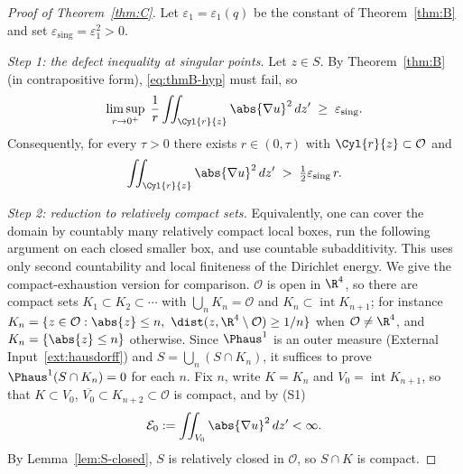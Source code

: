 \documentclass[11pt,reqno]{amsart}
\begin{document}
\begin{proof}[Proof of Theorem~\ref{thm:C}]
Let $\varepsilon_{1}=\varepsilon_{1}(q)$ be the constant of
Theorem~\ref{thm:B} and set $\varepsilon_{\mathrm{sing}}=\varepsilon_{1}^{2}>0$.

\emph{Step 1: the defect inequality at singular points.} Let $z\in S$. By
Theorem~\ref{thm:B} (in contrapositive form), \eqref{eq:thmB-hyp} must fail, so
\begin{equation}\label{eq:defect}
  \limsup_{r\to0^{+}}\;\frac1r\iint_{\Cyl{r}{z}}\abs{\nabla u}^{2}\,dz'
  \;\ge\;\varepsilon_{\mathrm{sing}}.
\end{equation}
Consequently, for every $\tau>0$ there exists $r\in(0,\tau)$ with
$\Cyl{r}{z}\subset\mathcal{O}$ and
\begin{equation}\label{eq:defect-r}
  \iint_{\Cyl{r}{z}}\abs{\nabla u}^{2}\,dz'\;>\;\tfrac12\varepsilon_{\mathrm{sing}}\,r .
\end{equation}

\emph{Step 2: reduction to relatively compact sets.}
Equivalently, one can cover the domain by countably many relatively
compact local boxes, run the following argument on each closed smaller
box, and use countable subadditivity. This uses only second countability
and local finiteness of the Dirichlet energy. We give the compact-exhaustion
version for comparison.
$\mathcal{O}$ is open in $\R^{4}$, so
there are compact sets $K_{1}\subset K_{2}\subset\cdots$ with
$\bigcup_{n}K_{n}=\mathcal{O}$ and $K_{n}\subset\operatorname{int}K_{n+1}$; for
instance $K_{n}=\{z\in\mathcal{O}:\abs{z}\le n,\ \dist(z,\R^{4}\setminus\mathcal{O})\ge1/n\}$
when $\mathcal{O}\ne\R^{4}$, and $K_{n}=\{\abs{z}\le n\}$ otherwise. Since
$\Phaus^{1}$ is an outer measure
(External Input~\ref{ext:hausdorff}) and $S=\bigcup_{n}(S\cap K_{n})$, it
suffices to prove $\Phaus^{1}(S\cap K_{n})=0$ for each $n$. Fix $n$, write
$K=K_{n}$ and $V_{0}=\operatorname{int}K_{n+1}$, so that $K\subset V_{0}$,
$\overline{V_{0}}\subset K_{n+2}\subset\mathcal{O}$ is compact, and by (S1)
\begin{equation}\label{eq:finite-dirichlet}
  \mathcal{E}_{0}:=\iint_{V_{0}}\abs{\nabla u}^{2}\,dz'<\infty .
\end{equation}
By Lemma~\ref{lem:S-closed}, $S$ is relatively closed in $\mathcal{O}$, so
$S\cap K$ is compact.


\end{proof}
\end{document}
